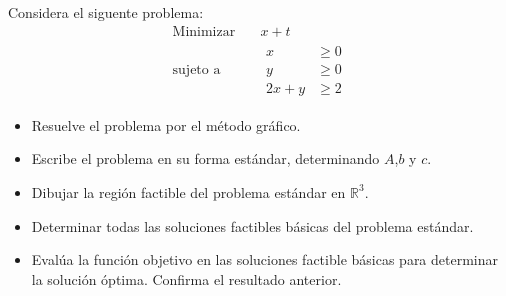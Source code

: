 \documentclass{article}
\begin{document}
Considera el siguente problema:
\begin{equation*}
  \begin{aligned}
    \text{Minimizar}\quad & x+t \\
    \text{sujeto a}\quad &
    \begin{aligned}
      x & \geq 0 \\
      y & \geq 0\\
      2x + y & \geq 2
    \end{aligned}
  \end{aligned}  
\end{equation*}
\begin{itemize}
\item Resuelve el problema por el método gráfico.
\item Escribe el problema en su forma estándar, determinando $A$,$b$ y $c$.
\item Dibujar la región factible del problema estándar en $\mathbb{R}^3$.
\item Determinar todas las soluciones factibles básicas del problema estándar.
\item Evalúa la función objetivo en las soluciones factible básicas para determinar la solución óptima. Confirma el resultado anterior.
\end{itemize}
\end{document}
